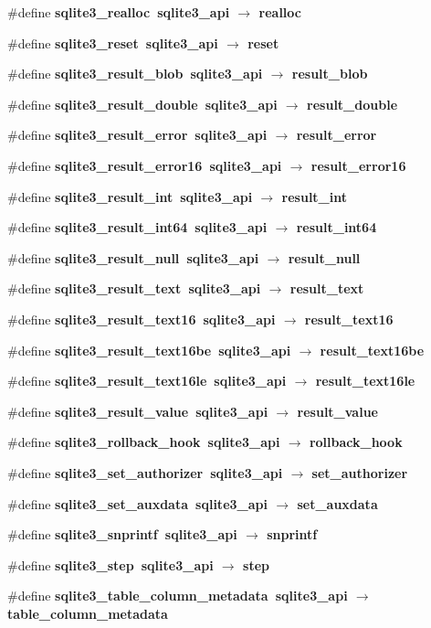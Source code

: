 \begin{CompactItemize}
\item 
\#define \bf{sqlite3\_\-realloc}~sqlite3\_\-api $\rightarrow$ realloc
\item 
\#define \bf{sqlite3\_\-reset}~sqlite3\_\-api $\rightarrow$ reset
\item 
\#define \bf{sqlite3\_\-result\_\-blob}~sqlite3\_\-api $\rightarrow$ result\_\-blob
\item 
\#define \bf{sqlite3\_\-result\_\-double}~sqlite3\_\-api $\rightarrow$ result\_\-double
\item 
\#define \bf{sqlite3\_\-result\_\-error}~sqlite3\_\-api $\rightarrow$ result\_\-error
\item 
\#define \bf{sqlite3\_\-result\_\-error16}~sqlite3\_\-api $\rightarrow$ result\_\-error16
\item 
\#define \bf{sqlite3\_\-result\_\-int}~sqlite3\_\-api $\rightarrow$ result\_\-int
\item 
\#define \bf{sqlite3\_\-result\_\-int64}~sqlite3\_\-api $\rightarrow$ result\_\-int64
\item 
\#define \bf{sqlite3\_\-result\_\-null}~sqlite3\_\-api $\rightarrow$ result\_\-null
\item 
\#define \bf{sqlite3\_\-result\_\-text}~sqlite3\_\-api $\rightarrow$ result\_\-text
\item 
\#define \bf{sqlite3\_\-result\_\-text16}~sqlite3\_\-api $\rightarrow$ result\_\-text16
\item 
\#define \bf{sqlite3\_\-result\_\-text16be}~sqlite3\_\-api $\rightarrow$ result\_\-text16be
\item 
\#define \bf{sqlite3\_\-result\_\-text16le}~sqlite3\_\-api $\rightarrow$ result\_\-text16le
\item 
\#define \bf{sqlite3\_\-result\_\-value}~sqlite3\_\-api $\rightarrow$ result\_\-value
\item 
\#define \bf{sqlite3\_\-rollback\_\-hook}~sqlite3\_\-api $\rightarrow$ rollback\_\-hook
\item 
\#define \bf{sqlite3\_\-set\_\-authorizer}~sqlite3\_\-api $\rightarrow$ set\_\-authorizer
\item 
\#define \bf{sqlite3\_\-set\_\-auxdata}~sqlite3\_\-api $\rightarrow$ set\_\-auxdata
\item 
\#define \bf{sqlite3\_\-snprintf}~sqlite3\_\-api $\rightarrow$ snprintf
\item 
\#define \bf{sqlite3\_\-step}~sqlite3\_\-api $\rightarrow$ step
\item 
\#define \bf{sqlite3\_\-table\_\-column\_\-metadata}~sqlite3\_\-api $\rightarrow$ table\_\-column\_\-metadata

\end{CompactItemize}

